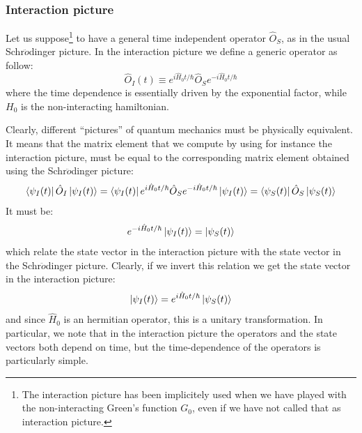 \documentclass[../main/main.tex]{subfiles}
\begin{document}
\subsubsection{Interaction picture}
Let us suppose\footnote{The interaction picture has been implicitely used when we have played with the non-interacting Green's function \( G_0 \), even if we have not called that as interaction picture.} to have a general time independent operator \( \hat{O}_S  \), as in the usual Schr$\ddot{o}$dinger picture.
In the interaction picture we define a generic operator as follow:
\begin{equation}
  \hat{O}_I (t) \equiv e^{i \hat{H}_0 t / \hbar  }  \hat{O}_S e^{-i \hat{H}_0 t / \hbar  }
  \label{eq:11_3}
\end{equation}
where the time dependence is essentially driven by the exponential factor, while \( H_0 \) is the non-interacting hamiltonian.

Clearly, different “pictures” of quantum mechanics must be physically equivalent. It means that the matrix element that we compute by using for instance the interaction picture, must be equal to the corresponding matrix element obtained using the Schr$\ddot{o}$dinger picture:
\begin{equation*}
  \bra{\psi _I (t)} \hat{O}_I \ket{\psi _I (t)}
  = \bra{\psi _I (t)} e^{i \hat{H}_0 t / \hbar  }  \hat{O}_S e^{-i \hat{H}_0 t / \hbar  } \ket{\psi _I (t)}
  =  \bra{\psi _S (t)} \hat{O}_S \ket{\psi _S (t)}
\end{equation*}
It must be:
\begin{equation*}
  e^{-i \hat{H}_0 t / \hbar  } \ket{\psi _I (t)} = \ket{\psi _S (t)}
\end{equation*}
which relate the state vector in the interaction picture with the state vector in the Schr$\ddot{o}$dinger picture. Clearly, if we invert this relation we get the state vector in the interaction picture:
\begin{equation}
  \ket{\psi_I (t) } =   e^{i \hat{H}_0 t / \hbar  } \ket{\psi _S (t)}
  \label{eq:11_4}
\end{equation}
and since \( \hat{H} _0 \) is an hermitian operator, this is a unitary transformation.
In particular, we note that in the interaction picture the operators and the state vectors both depend on time, but the time-dependence of the operators is particularly simple.
\end{document}
